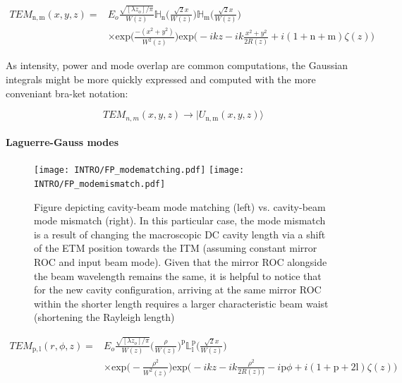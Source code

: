 \begin{equation}\label{eq:HG_beam}
	\begin{split}
		TEM_\mathrm{n,m}(x,y,z) = & E_o \frac{\sqrt{[\lambda z_o] / \pi}}{W(z)}\mathbb{H}_\mathrm{n}\bigg(\frac{\sqrt{2}x}{W(z)}\bigg)\mathbb{H}_\mathrm{m}\bigg(\frac{\sqrt{2}x}{W(z)}\bigg)\\
					& \times \mathrm{exp}\bigg(\frac{-(x^2+y^2)}{W^2(z)}\bigg) \mathrm{exp}\bigg(-ikz - ik\frac{x^2 + y^2}{2R(z)} + i (1+\mathrm{n}+\mathrm{m})\zeta(z)\bigg)
	\end{split}
\end{equation}


As intensity, power and mode overlap are common computations, the Gaussian integrals might be more quickly expressed and computed with the more conveniant bra-ket notation:

$$TEM_{n,m}(x,y,z) \rightarrow | U_\mathrm{n,m}(x,y,z)\rangle$$

\paragraph*{Laguerre-Gauss modes}
\begin{figure}[H]
\begin{subcaptiongroup}
	\texttt{[image: INTRO/FP\_modematching.pdf]}
	\hspace{3.5mm}
	\texttt{[image: INTRO/FP\_modemismatch.pdf]}
\end{subcaptiongroup}
\hfill
\caption{Figure depicting cavity-beam mode matching (left) vs. cavity-beam mode mismatch (right). In this particular case, the mode mismatch is a result of changing the macroscopic DC cavity length via a shift of the ETM position towards the ITM (assuming constant mirror ROC and input beam mode). Given that the mirror ROC alongside the beam wavelength remains the same, it is helpful to notice that for the new cavity configuration, arriving at the same mirror ROC within the shorter length requires a larger characteristic beam waist (shortening the Rayleigh length)}
\label{fig:fp_modemismatch}
\end{figure}

\begin{equation}\label{eq:LG_beam}
	\begin{split}
	TEM_\mathrm{p,l}(r,\phi,z) = & E_o \frac{\sqrt{[\lambda z_o] / \pi}}{W(z)} \bigg(\frac{\rho}{W(z)}\bigg)^\mathrm{p}\mathbb{L}^{\mathrm{p}}_{\mathrm{l}}\bigg(\frac{\sqrt{2}x}{W(z)}\bigg)\\
				   &  \times \mathrm{exp}\bigg(-\frac{\rho^2}{W^2(z)}\bigg) \mathrm{exp}\bigg(-ikz - ik\frac{\rho^2}{2R(z))} - i\mathrm{p}\phi + i (1+\mathrm{p}+2\mathrm{l})\zeta(z)\bigg)
	\end{split}
\end{equation}


